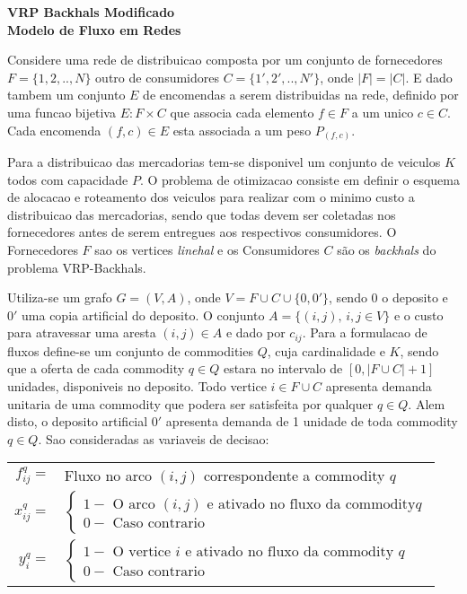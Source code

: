 \documentclass[12pt]{article}
\begin{document}
\begin{center}
\textbf{VRP Backhals Modificado} \\
\textbf{Modelo de Fluxo em Redes} \\
\end{center}
\vspace{0.4cm}
\noindent Considere uma rede de distribuicao composta por um conjunto de fornecedores $F=\{1,2,..,N\}$ outro de consumidores $C=\{1',2',..,N'\}$, onde $|F|=|C|$. E dado tambem um conjunto $E$ de encomendas a serem distribuidas na rede, definido por uma funcao bijetiva $E:F \times C$ que associa cada elemento $f \in F$ a um unico $c \in C$. Cada encomenda $(f,c) \in E$ esta associada a um peso $P_{(f,c)}$.

\vspace{0.2cm}
Para a distribuicao das mercadorias tem-se disponivel um conjunto de veiculos $K$ todos com capacidade $P$. O problema de otimizacao consiste em definir o esquema de alocacao e roteamento dos veiculos para realizar com o minimo custo a distribuicao das mercadorias, sendo que todas devem ser coletadas nos fornecedores antes de serem entregues aos respectivos consumidores. O Fornecedores $F$ sao os vertices \textit{linehal} e os Consumidores $C$ são os \textit{backhals} do problema VRP-Backhals.

\vspace{0.2cm}
Utiliza-se um grafo $G=(V,A)$, onde $V = F \cup C \cup \{0,0'\}$, sendo $0$ o deposito e $0'$ uma copia artificial do deposito. O conjunto $A=\{(i,j), \, i,j \in V\}$ e o custo para atravessar uma aresta $(i,j) \in A$ e dado por $c_{ij}$. Para a formulacao de fluxos define-se um conjunto de commodities $Q$, cuja cardinalidade e $K$, sendo que a oferta de cada commodity $q \in Q$ estara no intervalo de $[0,|F \cup C|+1]$ unidades, disponiveis no deposito. Todo vertice $i \in F \cup C$ apresenta demanda unitaria de uma commodity que podera ser satisfeita por qualquer $q \in Q$. Alem disto, o deposito artificial $0'$ apresenta demanda de 1 unidade de toda commodity $q \in Q$. Sao consideradas as variaveis de decisao:

\vspace{0.8cm}
\begin{table}[!htb]
\begin{tabular}{rl}
$f^q_{ij} = $ & Fluxo no arco $(i,j)$ correspondente a commodity $q$ \\
$x^q_{ij} = $ &
$\left\{
\begin{array} {l}
1 - \textrm{ O arco } (i,j) \textrm{ e ativado no fluxo da commodity} q\\
0 - \textrm{ Caso contrario}
\end{array} \right.
$
\\
$y^q_i = $ &
$\left\{
\begin{array} {l}
1 - \textrm{ O vertice } i \textrm{ e ativado no fluxo da commodity } q \\
0 - \textrm{ Caso contrario}
\end{array} \right.
$
\end{tabular}
\end{table}
\end{document}
